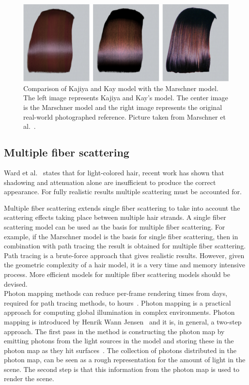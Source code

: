 \documentclass[11pt,a4paper]{report}
\begin{document}
\begin{figure}
\begin{center}
\includegraphics[scale=0.15]{kajiya.png}
\caption{Comparison of Kajiya and Kay model with the Marschner model. The left image represents Kajiya and Kay's model. The center image is the Marschner model and the right image represents the original real-world photographed reference. Picture taken from Marschner et al.~\cite{marschner}.}
\label{fig_compare_kajiya}
\end{center}
\end{figure}


\subsection{Multiple fiber scattering}

Ward et al.~\cite{ward} states that for light-colored hair, recent work has shown that shadowing and attenuation alone are insufficient to produce the correct appearance. For fully realistic results multiple scattering must be accounted for.

Multiple fiber scattering extends single fiber scattering to take into account the scattering effects taking place between multiple hair strands. A single fiber scattering model can be used as the basis for multiple fiber scattering. For example, if the Marschner model is the basis for single fiber scattering, then in combination with path tracing the result is obtained for multiple fiber scattering. Path tracing is a brute-force approach that gives realistic results. However, given the geometric complexity of a hair model, it is a very time and memory intensive process. More efficient models for multiple fiber scattering models should be devised.\\

Photon mapping methods can reduce per-frame rendering times from days, required for path tracing methods, to hours~\cite{ward}. Photon mapping is a practical approach for computing global illumination in complex environments. Photon mapping is introduced by Henrik Wann Jensen~\cite{jensen} and it is, in general, a two-step approach.
The first pass in the method is constructing the photon map by emitting photons from the light sources in the model and storing these in the photon map as they hit surfaces~\cite{jensen}. The collection of photons distributed in the photon map, can be seen as a rough representation for the amount of light in the scene. The second step is that this information from the photon map is used to render the scene.
\end{document}
